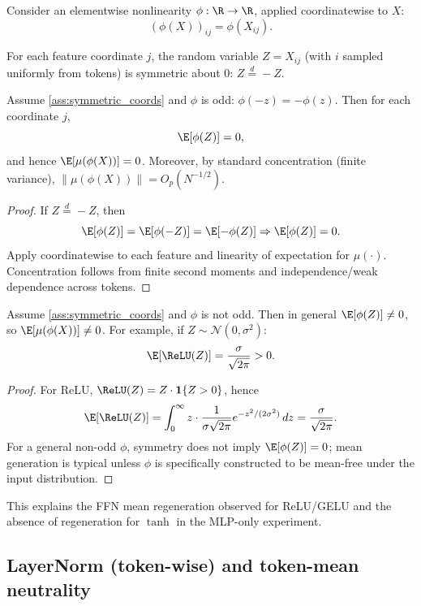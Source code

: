 Consider an elementwise nonlinearity $\phi:\R\to\R$, applied coordinatewise to $X$:
\[
(\phi(X))_{ij}=\phi(X_{ij}).
\]

\begin{assumption}
\label{ass:symmetric_coords}
For each feature coordinate $j$, the random variable $Z=X_{ij}$ (with $i$ sampled uniformly from tokens)
is symmetric about $0$: $Z\overset{d}{=}-Z$.
\end{assumption}

\begin{theorem}
\label{thm:odd_phi}
Assume \ref{ass:symmetric_coords} and $\phi$ is odd: $\phi(-z)=-\phi(z)$.
Then for each coordinate $j$,
\[
\E[\phi(Z)] = 0,
\]
and hence $\E[\mu(\phi(X))]=0$.
Moreover, by standard concentration (finite variance), $\|\mu(\phi(X))\|=O_p(N^{-1/2})$.
\end{theorem}

\begin{proof}
If $Z\overset{d}{=}-Z$, then
\[
\E[\phi(Z)] = \E[\phi(-Z)] = \E[-\phi(Z)] \Rightarrow \E[\phi(Z)]=0.
\]
Apply coordinatewise to each feature and linearity of expectation for $\mu(\cdot)$.
Concentration follows from finite second moments and independence/weak dependence across tokens.
\end{proof}

\begin{theorem}
\label{thm:nonodd_phi}
Assume \ref{ass:symmetric_coords} and $\phi$ is not odd.
Then in general $\E[\phi(Z)]\neq 0$, so $\E[\mu(\phi(X))]\neq 0$.
For example, if $Z\sim\mathcal{N}(0,\sigma^2)$:
\[
\E[\ReLU(Z)] = \frac{\sigma}{\sqrt{2\pi}} > 0.
\]
\end{theorem}

\begin{proof}
For ReLU, $\ReLU(Z)=Z\cdot\mathbf{1}\{Z>0\}$, hence
\[
\E[\ReLU(Z)] = \int_0^\infty z \cdot \frac{1}{\sigma\sqrt{2\pi}} e^{-z^2/(2\sigma^2)}\,dz
= \frac{\sigma}{\sqrt{2\pi}}.
\]
For a general non-odd $\phi$, symmetry does not imply $\E[\phi(Z)]=0$; mean generation is typical unless $\phi$ is specifically constructed to be mean-free under the input distribution.
\end{proof}

This explains the FFN mean regeneration observed for ReLU/GELU and the absence of regeneration for $\tanh$ in the MLP-only experiment.

\subsection{LayerNorm (token-wise) and token-mean neutrality}

